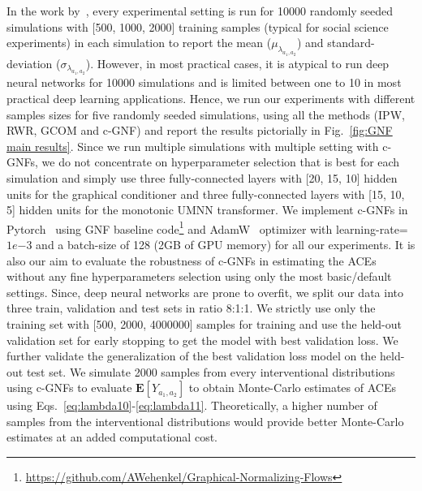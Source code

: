 \documentclass[letterpaper]{article} %
\begin{document}
In the work by~\citet{wodtke2020rwr}, every experimental setting is run for 10000 randomly seeded simulations with [500, 1000, 2000] training samples (typical for social science experiments) in each simulation to report the mean ($\mu_{\lambda_{a_1,a_2}}$) and standard-deviation ($\sigma_{\lambda_{a_1,a_2}}$).
However, in most practical cases, it is atypical to run deep neural networks for 10000 simulations and is limited between one to 10 in most practical deep learning applications.
Hence, we run our experiments with different samples sizes for five randomly seeded simulations,
using all the methods (IPW, RWR, GCOM and c-GNF) and report the results pictorially in Fig.~\ref{fig:GNF main results}.
Since we run multiple simulations with multiple setting with c-GNFs, we do not concentrate on hyperparameter selection that is best for each simulation and simply use three fully-connected layers with [20, 15, 10] hidden units for the graphical conditioner and three fully-connected layers with [15, 10, 5] hidden units for the monotonic UMNN transformer.
We implement c-GNFs in Pytorch~\cite{paszke2017pytorch} using GNF baseline code\footnote{\url{https://github.com/AWehenkel/Graphical-Normalizing-Flows}} and AdamW~\cite{LoshchilovH2019adamw} optimizer with learning-rate=$1e{-3}$ and a batch-size of 128 (2GB of GPU memory) for all our experiments.
It is also our aim to evaluate the robustness of c-GNFs in estimating the ACEs without any fine hyperparameters selection using only the most basic/default settings.
Since, deep neural networks are prone to overfit, we split our data into three train, validation and test sets in ratio 8:1:1. We strictly use only the training set with [500, 2000, 4000000] samples for training and use the held-out validation set for early stopping to get the model with best validation loss.
We further validate the generalization of the best validation loss model on the held-out test set.
We simulate 2000 samples from every interventional distributions using c-GNFs to evaluate $\mathbf{E}[Y_{a_1,a_2}]$ to obtain Monte-Carlo estimates of ACEs using Eqs.~\eqref{eq:lambda10}-\eqref{eq:lambda11}. Theoretically, a higher number of samples from the interventional distributions would provide better Monte-Carlo estimates at an added computational cost.
\end{document}
